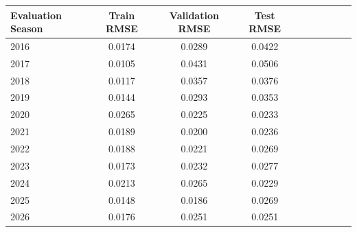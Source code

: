 \begin{tabular}{lccccccccc}
\toprule
Evaluation Season & Train RMSE & Validation RMSE & Test RMSE \\
\midrule
2016 & 0.0174 & 0.0289 & 0.0422 \\
2017 & 0.0105 & 0.0431 & 0.0506 \\
2018 & 0.0117 & 0.0357 & 0.0376 \\
2019 & 0.0144 & 0.0293 & 0.0353 \\
2020 & 0.0265 & 0.0225 & 0.0233 \\
2021 & 0.0189 & 0.0200 & 0.0236 \\
2022 & 0.0188 & 0.0221 & 0.0269 \\
2023 & 0.0173 & 0.0232 & 0.0277 \\
2024 & 0.0213 & 0.0265 & 0.0229 \\
2025 & 0.0148 & 0.0186 & 0.0269 \\
2026 & 0.0176 & 0.0251 & 0.0251 \\
\bottomrule
\end{tabular}
